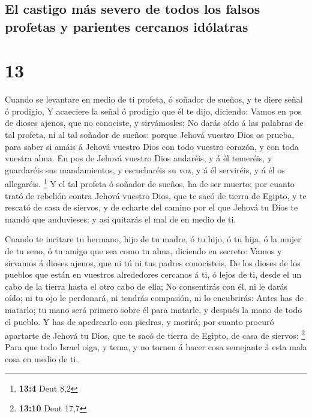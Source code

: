 \hypertarget{el-castigo-muxe1s-severo-de-todos-los-falsos-profetas-y-parientes-cercanos-iduxf3latras}{%
\subsection{El castigo más severo de todos los falsos profetas y
parientes cercanos
idólatras}\label{el-castigo-muxe1s-severo-de-todos-los-falsos-profetas-y-parientes-cercanos-iduxf3latras}}

\hypertarget{section-12}{%
\section{13}\label{section-12}}

 Cuando se levantare en medio de ti profeta, ó soñador de
sueños, y te diere señal ó prodigio,  Y acaeciere la señal ó
prodigio que él te dijo, diciendo: Vamos en pos de dioses ajenos, que no
conociste, y sirvámosles;  No darás oído á las palabras de
tal profeta, ni al tal soñador de sueños: porque Jehová vuestro Dios os
prueba, para saber si amáis á Jehová vuestro Dios con todo vuestro
corazón, y con toda vuestra alma.  En pos de Jehová vuestro
Dios andaréis, y á él temeréis, y guardaréis sus mandamientos, y
escucharéis su voz, y á él serviréis, y á él os allegaréis. \footnote{\textbf{13:4}
  Deut 8,2}  Y el tal profeta ó soñador de sueños, ha de ser
muerto; por cuanto trató de rebelión contra Jehová vuestro Dios, que te
sacó de tierra de Egipto, y te rescató de casa de siervos, y de echarte
del camino por el que Jehová tu Dios te mandó que anduvieses: y así
quitarás el mal de en medio de ti.

 Cuando te incitare tu hermano, hijo de tu madre, ó tu hijo,
ó tu hija, ó la mujer de tu seno, ó tu amigo que sea como tu alma,
diciendo en secreto: Vamos y sirvamos á dioses ajenos, que ni tú ni tus
padres conocisteis,  De los dioses de los pueblos que están
en vuestros alrededores cercanos á ti, ó lejos de ti, desde el un cabo
de la tierra hasta el otro cabo de ella;  No consentirás con
él, ni le darás oído; ni tu ojo le perdonará, ni tendrás compasión, ni
lo encubrirás:  Antes has de matarlo; tu mano será primero
sobre él para matarle, y después la mano de todo el pueblo.
 Y has de apedrearlo con piedras, y morirá; por cuanto
procuró apartarte de Jehová tu Dios, que te sacó de tierra de Egipto, de
casa de siervos: \footnote{\textbf{13:10} Deut 17,7}  Para
que todo Israel oiga, y tema, y no tornen á hacer cosa semejante á esta
mala cosa en medio de ti.

